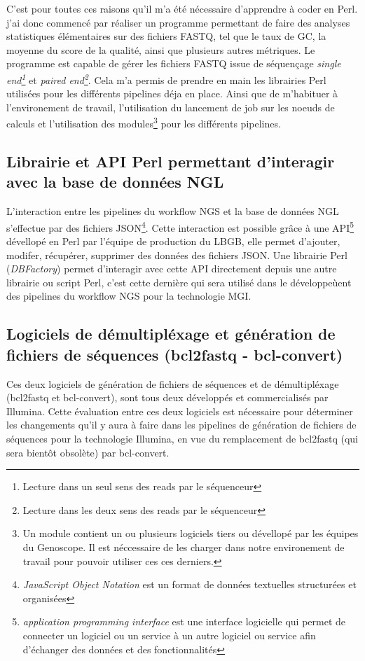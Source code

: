 C'est pour toutes ces raisons qu'il m'a été nécessaire d'apprendre à coder en Perl. j'ai donc commencé par réaliser un programme permettant de faire des analyses statistiques élémentaires sur des fichiers FASTQ, tel que le taux de GC, la moyenne du score de la qualité, ainsi que plusieurs autres métriques. Le programme est capable de gérer les fichiers FASTQ issue de séquençage \emph{single end\footnote{Lecture dans un seul sens des reads par le séquenceur}} et \emph{paired end\footnote{Lecture dans les deux sens des reads par le séquenceur}}. Cela m'a permis de prendre en main les librairies Perl utilisées pour les différents pipelines déja en place. Ainsi que de m'habituer à l'environement de travail, l'utilisation du lancement de job sur les noeuds de calculs et l'utilisation des modules\footnote{Un module contient un ou plusieurs logiciels tiers ou dévellopé par les équipes du Genoscope. Il est néccessaire de les charger dans notre environement de travail pour pouvoir utiliser ces ces derniers.} pour les différents pipelines.

\subsection{Librairie et API Perl permettant d'interagir avec la base de données NGL}
L'interaction entre les pipelines du workflow NGS et la base de données NGL s'effectue par des fichiers JSON\footnote{\emph{JavaScript Object Notation} est un format de données textuelles structurées et organisées}.
Cette interaction est possible grâce à une API\footnote{\emph{application programming interface} est une interface logicielle qui permet de \og connecter \fg{} un logiciel ou un service à un autre logiciel ou service afin d'échanger des données et des fonctionnalités} dévellopé en Perl par l'équipe de \og production\fg{} du LBGB, elle permet d'ajouter, modifer, récupérer, supprimer des données des fichiers JSON. Une librairie Perl (\emph{DBFactory}) permet d'interagir avec cette API directement depuis une autre librairie ou script Perl, c'est cette dernière qui sera utilisé dans le développeùent des pipelines du workflow NGS pour la technologie MGI.

\subsection{Logiciels de démultipléxage et génération de fichiers de séquences (bcl2fastq - bcl-convert)}
\label{DBFactory}
Ces deux logiciels de génération de fichiers de séquences et de démultipléxage (bcl2fastq et bcl-convert), sont tous deux développés et commercialisés par Illumina. Cette évaluation entre ces deux logiciels est nécessaire pour déterminer les changements qu'il y aura à faire dans les pipelines de génération de fichiers de séquences pour la technologie Illumina, en vue du remplacement de bcl2fastq (qui sera bientôt obsolète) par bcl-convert.

